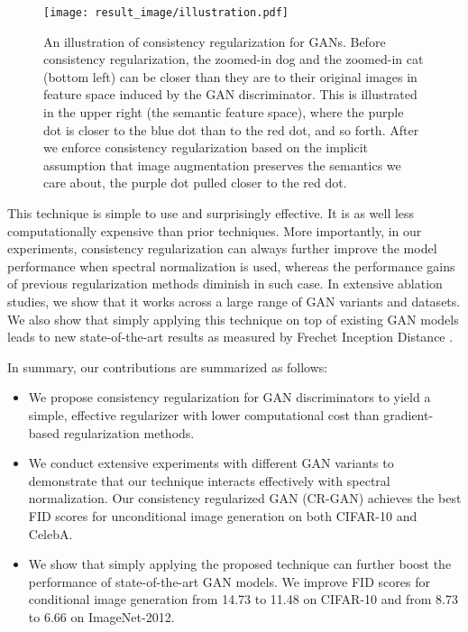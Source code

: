 \documentclass{article} \usepackage{iclr2020_conference,times}
\begin{document}
\begin{figure}[t]
    \centering
    \texttt{[image: result\_image/illustration.pdf]}
    \caption{
    An illustration of consistency regularization for GANs. Before consistency regularization, 
    the zoomed-in dog and the zoomed-in cat (bottom left) can be closer than they are to their original images in feature space induced by the GAN discriminator.
    This is illustrated in the upper right (the semantic feature space), where the purple dot is closer to the 
    blue dot than to the red dot, and so forth.
    After we enforce consistency regularization based on the implicit assumption 
    that image augmentation preserves the semantics we care about, the purple dot pulled
    closer to the red dot.
    }
    \label{fig:illustration}
\end{figure}


This technique is simple to use and surprisingly effective.
It is as well less computationally expensive than prior techniques. 
More importantly, in our experiments, consistency regularization can always further improve the model performance when spectral normalization is used, whereas the performance gains of previous regularization methods diminish in such case. In extensive ablation studies, we show that it works across a large range of GAN variants
and datasets.
We also show that simply applying this technique on top of existing GAN models leads to
new state-of-the-art results as measured by Frechet Inception Distance \citep{FID}.

In summary, our contributions are summarized as follows:
    \begin{itemize}
    \item We propose consistency regularization for GAN discriminators to yield a simple, effective regularizer with lower computational cost than gradient-based regularization methods.
    \item We conduct extensive experiments with different GAN variants to demonstrate that our technique interacts effectively with spectral normalization. Our consistency regularized GAN (CR-GAN) achieves the best FID scores for unconditional image generation on both CIFAR-10 and CelebA.
    \item  We show that simply applying the proposed technique can further boost the performance of state-of-the-art GAN models. We improve FID scores for conditional image generation from 14.73 to 11.48 on CIFAR-10 and from 8.73 to 6.66 on ImageNet-2012.
\end{itemize}
\end{document}

